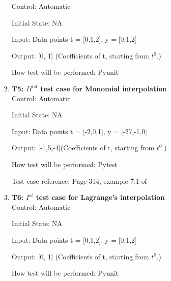 \documentclass[12pt, titlepage]{article}
\begin{document}
\begin{enumerate}
Control: Automatic 

Initial State: NA

Input: Data points t = [0,1,2], y = [0,1,2]

Output: [0, 1] (Coefficients of t, starting from $t^{0}$.)

How test will be performed: Pyunit\\


\item{\textbf{T5: ${II}^{nd}$ test case for Monomial interpolation}}\\

Control: Automatic
					
Initial State: NA
					
Input: Data points t = [-2,0,1], y = [-27,-1,0]

Output: [-1,5,-4](Coefficients of t, starting from $t^{0}$.)

How test will be performed: Pytest

Test case reference: Page 314, example 7.1 of ~\cite{Health1997}\\


					
\item{\textbf{T6: $I^{st}$ test case for Lagrange's interpolation} \\}   
Control:
  Automatic

Initial State: NA

Input: Data points t = [0,1,2], y = [0,1,2]

Output: [0, 1] (Coefficients of t, starting from $t^{0}$.)

How test will be performed: Pyunit \\ 




\end{enumerate}
\end{document}
